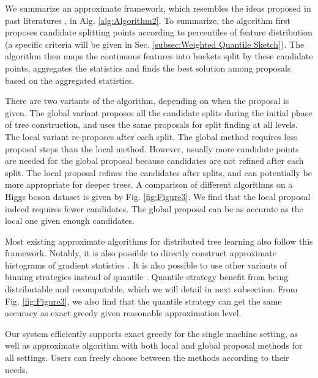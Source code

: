 \documentclass[sigconf]{acmart}
\begin{document}
We summarize an approximate framework, which resembles 
the ideas proposed in past literatures \cite{li2007mcrank,bekkerman2011scaling,tyree2011parallel}, in Alg. \ref{alg:Algorithm2}. To summarize, the algorithm first proposes candidate 
splitting points according to percentiles of feature distribution (a specific criteria will be given in Sec. \ref{subsec:Weighted Quantile Sketch}). The
algorithm then maps the continuous features into buckets split by these candidate points, aggregates the statistics
and finds the best solution among proposals based on the aggregated statistics.

There are two variants of the algorithm, depending on when the proposal is given. The global variant proposes all
the candidate splits during the initial phase of tree construction, and uses the same proposals for split finding at all 
levels. The local variant re-proposes after each split. The global method requires less proposal steps than the local method.
However, usually more candidate points are needed for the global proposal because candidates are not refined after each
split. The local proposal refines the candidates after splits, and can potentially be more appropriate for deeper trees. A
comparison of different algorithms on a Higgs boson dataset is given by Fig. \ref{fig:Figure3}. We find that the local proposal indeed
requires fewer candidates. The global proposal can be as accurate as the local one given enough candidates.

Most existing approximate algorithms for distributed tree learning also follow this framework. Notably, it is also 
possible to directly construct approximate histograms of gradient statistics \cite{tyree2011parallel}. It is also possible to use other 
variants of binning strategies instead of quantile \cite{li2007mcrank}. Quantile strategy benefit from being distributable and 
recomputable, which we will detail in next subsection. From Fig. \ref{fig:Figure3}, we also find that the quantile strategy can get 
the same accuracy as exact greedy given reasonable approximation level.

Our system efficiently supports exact greedy for the single machine setting, as well as approximate algorithm with both
local and global proposal methods for all settings. Users can freely choose between the methods according to their needs.
\end{document}
